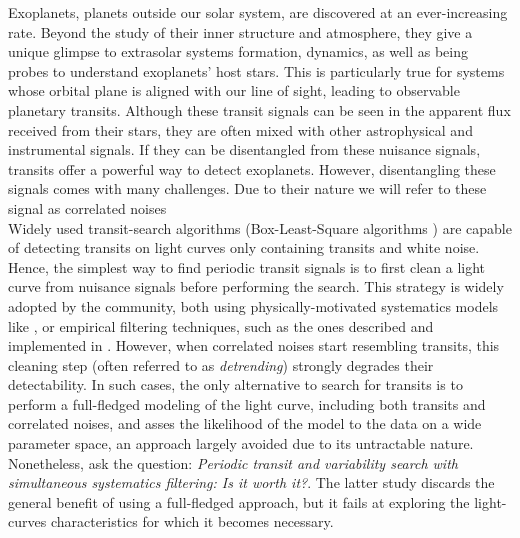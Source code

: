 \documentclass{aastex631}
\begin{document}
Exoplanets, planets outside our solar system, are discovered at an ever-increasing rate. Beyond the study of their inner structure and atmosphere, they give a unique glimpse to extrasolar systems formation, dynamics, as well as being probes to understand exoplanets' host stars. This is particularly true for systems whose orbital plane is aligned with our line of sight, leading to observable planetary transits. Although these transit signals can be seen in the apparent flux received from their stars, they are often mixed with other astrophysical and instrumental signals.
If they can be disentangled from these nuisance signals, transits offer a powerful way to detect exoplanets. However, disentangling these signals comes with many challenges. Due to their nature we will refer to these signal as correlated noises\\
Widely used transit-search algorithms (Box-Least-Square algorithms \cite{bls}) are capable of detecting transits on light curves only containing transits and white noise. Hence, 
the simplest way to find periodic transit signals is to first clean a light curve from nuisance signals before performing the search. This strategy is widely adopted by the community, both using physically-motivated systematics models like \cite{everest1, everest2}, or empirical filtering techniques, such as the ones described and implemented in \cite{wotan}. However, when correlated noises start resembling transits, this cleaning step (often referred to as \textit{detrending}) strongly degrades their detectability. In such cases, the only alternative to search for transits is to perform a full-fledged modeling of the light curve, including both transits and correlated noises, and asses the likelihood of the model to the data on a wide parameter space, an approach largely avoided due to its untractable nature. Nonetheless, \citealt{kovacs2016} ask the question: \textit{Periodic transit and variability search with simultaneous systematics filtering: Is it worth it?}. The latter study discards the general benefit of using a full-fledged approach, but it fails at exploring the light-curves characteristics for which it becomes necessary.\\
\end{document}
